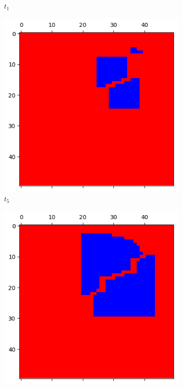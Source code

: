 \documentclass[letterpaper]{article}
\begin{document}
\begin{figure}
\begin{subfigure}{.33\textwidth}
      \caption{$t_1$}
      \label{fig:t1_50part1}
    \end{subfigure}
    \begin{subfigure}{.33\textwidth}
      \centering
      \includegraphics[width=1\linewidth]{images/assign2/visu_50-part1/t5}
      \caption{$t_5$}
      \label{fig:t5_50part1}
    \end{subfigure}
    \begin{subfigure}{.33\textwidth}
      \centering
      \includegraphics[width=1\linewidth]{images/assign2/visu_50-part1/t10}

\end{subfigure}
\end{figure}
\end{document}
